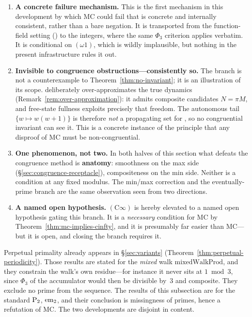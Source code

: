 \begin{enumerate}[leftmargin=*]
\item \textbf{A concrete failure mechanism.}  This is the first
  mechanism in this development by which MC could fail that is
  concrete and internally consistent, rather than a bare negation.  It
  is transported from the function-field setting
  () to the integers, where
  the same $\Phi_3$ criterion applies verbatim.  It is conditional on
  $(\omega 1)$, which is wildly implausible, but nothing in the
  present infrastructure rules it out.

\item \textbf{Invisible to congruence obstructions---consistently so.}
  The branch is not a counterexample to Theorem~\ref{thm:no-invariant};
  it is an illustration of its scope.   deliberately
  over-approximates the true dynamics
  (Remark~\ref{rem:over-approximation}): it admits composite candidates
  $N = \pi M$, and free-state fullness exploits precisely that freedom.
  The autonomous tail $\{w \mapsto w(w{+}1)\}$ is therefore \emph{not}
  a propagating set for , so no congruential invariant
  can see it.  This is a concrete instance of the principle that any
  disproof of MC must be non-congruential.

\item \textbf{One phenomenon, not two.}  In both halves of this section
  what defeats the congruence method is \textbf{anatomy}: smoothness on
  the max side (\S\ref{sec:congruence-receptacle}), compositeness on the
  min side.  Neither is a condition at any fixed modulus.  The
  min/max correction and the eventually-prime branch are the same
  observation seen from two directions.

\item \textbf{A named open hypothesis.}  $(\mathrm{C}\infty)$ is
  hereby elevated to a named open hypothesis gating this branch.  It is
  a \emph{necessary} condition for MC by
  Theorem~\ref{thm:mc-implies-cinfty}, and it is presumably far easier
  than MC---but it is open, and closing the branch requires it.
\end{enumerate}

\begin{remark}
\label{rem:mixed-perpetual}
Perpetual primality already appears in \S\ref{sec:variants}
(Theorem~\ref{thm:perpetual-periodicity}).  Those results are stated
for the \emph{mixed} walk $\mathrm{mixedWalkProd}$, and they constrain
the walk's own residue---for instance it never sits at $1 \bmod 3$,
since $\Phi_3$ of the accumulator would then be divisible by~$3$ and
composite.  They exclude no prime from the sequence.  The results of
this subsection are for the standard $\mathrm{P}_{2}$, $\mathrm{em}_{2}$, and their
conclusion is missingness of primes, hence a refutation of MC\@.  The
two developments are disjoint in content.
\end{remark}

